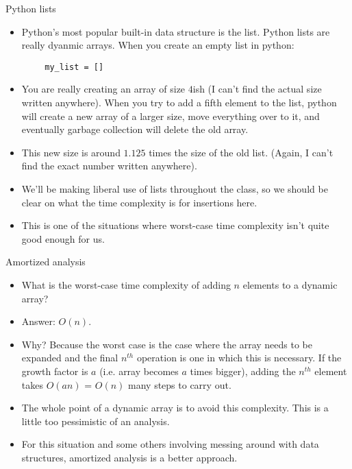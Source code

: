 \documentclass{beamer}
\begin{document}
\begin{frame}[fragile]{Python lists}
    \begin{itemize}
        \item Python's most popular built-in data structure is the list. Python lists are really dyanmic arrays. When you create an empty list in python:
    \end{itemize}
    \begin{verbatim}
        my_list = []
    \end{verbatim}
    \begin{itemize}
        \item You are really creating an array of size $4$ish (I can't find the actual size written anywhere). When you try to add a fifth element to the list, python will create a new array of a larger size, move everything over to it, and eventually garbage collection will delete the old array. 
        \item This new size is around $1.125$ times the size of the old list. (Again, I can't find the exact number written anywhere). 
        \item We'll be making liberal use of lists throughout the class, so we should be clear on what the time complexity is for insertions here.
        \pause
        \item This is one of the situations where worst-case time complexity isn't quite good enough for us. 
    \end{itemize}
\end{frame}

\begin{frame}{Amortized analysis}
    \begin{itemize}
        \item What is the worst-case time complexity of adding $n$ elements to a dynamic array?
        \pause
        \item Answer: $O(n)$. 
        \item Why? Because the worst case is the case where the array needs to be expanded and the final $n^{th}$ operation is one in which this is necessary. If the growth factor is $a$ (i.e. array becomes $a$ times bigger), adding the $n^{th}$ element takes $O(an)$ = $O(n)$ many steps to carry out. 
        \item The whole point of a dynamic array is to avoid this complexity. This is a little too pessimistic of an analysis. 
        \item For this situation and some others involving messing around with data structures, amortized analysis is a better approach. 
    \end{itemize}
\end{frame}
\end{document}
